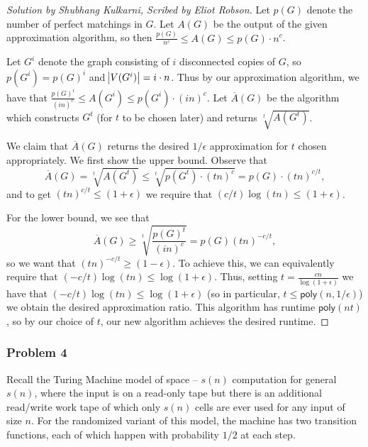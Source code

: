 \documentclass{article}
\newenvironment{scribed}[2]{\begin{proof}[Solution by #1, Scribed by #2]}{\end{proof}}
\newcommand{\poly}{\mathsf{poly}}
\begin{document}
\begin{scribed}{Shubhang Kulkarni}{Eliot Robson}
    Let \(p(G)\) denote the number of perfect matchings in \(G\). Let \(A(G)\) be the output of the given approximation algorithm, so then \(\frac{p(G)}{n^c} \leq A(G) \leq p(G) \cdot n^c\).
    
    Let \(G^i\) denote the graph consisting of \(i\) disconnected copies of \(G\), so \(p(G^i) = p(G)^i\) and \(\abs{V(G^i)} = i \cdot n\). Thus by our approximation algorithm, we have that \(\frac{p(G)^i}{(in)^c} \leq A(G^i) \leq p(G^i) \cdot (in)^c\). Let \(\overline{A}(G)\) be the algorithm which constructs \(G^t\) (for \(t\) to be chosen later) and returns \(\sqrt[t]{A(G^t)}\).
    
    We claim that \(\overline{A}(G)\) returns the desired \(1/\epsilon\) approximation for \(t\) chosen appropriately. We first show the upper bound. Observe that
    \[
        \overline{A}(G)
        =%
        \sqrt[t]{A(G^t)}
        \leq%
        \sqrt[t]{p(G^t) \cdot (tn)^c}
        =%
        p(G) \cdot (tn)^{c / t},
    \]
    and to get \((tn)^{c/t} \leq (1 + \epsilon)\) we require that \((c/t) \log (tn) \leq (1 + \epsilon)\).
    
    For the lower bound, we see that
    \[
        \overline{A}(G)
        \geq%
        \sqrt[t]{\frac{p(G)^t}{(in)^c}}
        =%
        p(G) (tn)^{-c / t},
    \]
    so we want that \((tn)^{-c / t} \geq (1 - \epsilon)\). To achieve this, we can equivalently require that \((-c/t) \log (tn) \leq \log (1 + \epsilon)\). Thus, setting \(t = \frac{cn}{\log(1 + \epsilon)}\) we have that \((-c/t) \log (tn) \leq \log (1 + \epsilon)\) (so in particular, \(t \leq \poly(n, 1/\epsilon)\)) we obtain the desired approximation ratio. This algorithm has runtime \(\poly(nt)\), so by our choice of \(t\), our new algorithm achieves the desired runtime.
\end{scribed}


\subsubsection{Problem 4}
Recall the Turing Machine model of space -- \(s(n)\) computation for general \(s(n)\), where the input is on a read-only tape but there is an additional read/write work tape of which only \(s(n)\) cells are ever used for any input of size \(n\). For the randomized variant of this model, the machine has two transition functions, each of which happen with probability \(1/2\) at each step.
\end{document}
